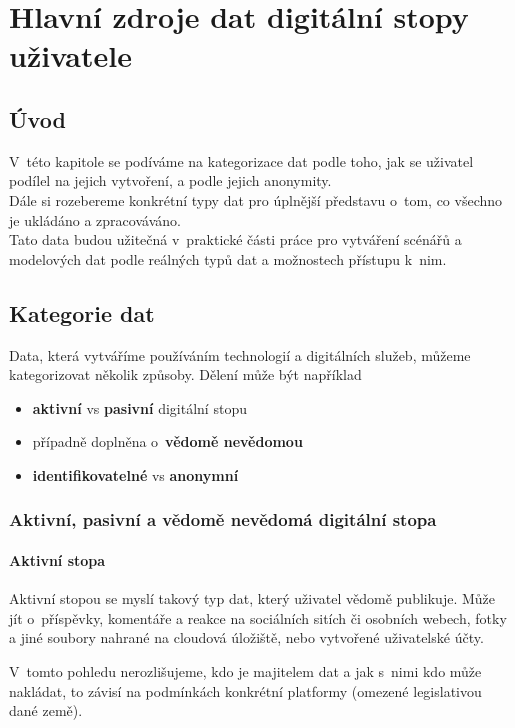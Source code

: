 \chapter{Hlavní zdroje dat digitální stopy uživatele}

\section{Úvod}
V~této kapitole se podíváme na kategorizace dat podle toho, jak se uživatel podílel na jejich vytvoření, a podle jejich anonymity.\\
Dále si rozebereme konkrétní typy dat pro úplnější představu o~tom, co všechno je ukládáno a zpracováváno.\\
Tato data budou užitečná v~praktické části práce pro vytváření scénářů a modelových dat podle reálných typů dat a možnostech přístupu k~nim.

\section{Kategorie dat}
Data, která vytváříme používáním technologií a digitálních služeb, můžeme kategorizovat několik způsoby. Dělení může být například
\begin{itemize}
	\item \textbf{aktivní} vs \textbf{pasivní} digitální stopu \citep{pew-digital-footprint}
    \item případně doplněna o~\textbf{vědomě nevědomou} \citep{fish-digital-footprint}
\item \textbf{identifikovatelné} vs \textbf{anonymní}
\end{itemize}


\subsection{Aktivní, pasivní a vědomě nevědomá digitální stopa}
\subsubsection*{Aktivní stopa}
Aktivní stopou se myslí takový typ dat, který uživatel vědomě publikuje. Může jít o~příspěvky, komentáře a reakce na sociálních sitích či osobních webech, fotky a jiné soubory nahrané na cloudová úložiště, nebo vytvořené uživatelské účty.\citep{pew-digital-footprint}

V~tomto pohledu nerozlišujeme, kdo je majitelem dat a jak s~nimi kdo může nakládat, to závisí na podmínkách konkrétní platformy (omezené legislativou dané země).

